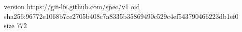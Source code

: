 version https://git-lfs.github.com/spec/v1
oid sha256:96772e1068b7ce2705b408c7a8335b35869490c529c4ef543790466223db1ef0
size 772
